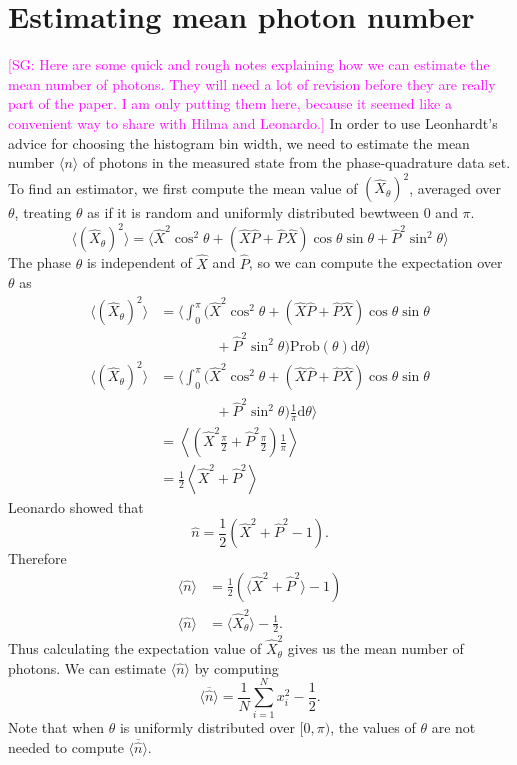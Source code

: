 \documentclass[
reprint,
superscriptaddress,
showpacs,
amsmath,
amssymb,
aps,
pra,
longbibliography
]{revtex4-1}
\providecommand{\aucmnt}[1]{#1}
\providecommand{\aucmnt}[1]{}
\newcommand{\SGc}[1]{\aucmnt{\textcolor{magenta}{[SG: #1]}}}
\begin{document}
\section{Estimating mean photon number}
\SGc{Here are some quick and rough notes explaining how we can
  estimate the mean number of photons.  They will need a lot of
  revision before they are really part of the paper.  I am only
  putting them here, because it seemed like a convenient way to share
  with Hilma and Leonardo.}  In order to use Leonhardt's advice for
choosing the histogram bin width, we need to estimate the mean number
$\langle n \rangle$ of photons in the measured state from the
phase-quadrature data set.  To find an estimator, we first compute the
mean value of $(\hat{X}_{\theta})^{2}$, averaged over $\theta$, treating
$\theta$ as if it is random and uniformly distributed bewtween $0$ and
$\pi$.
\begin{equation}
\langle (\hat{X}_{\theta})^{2} \rangle = \langle \hat{X}^{2}\cos^{2}\theta + (\hat{X}\hat{P}+\hat{P}\hat{X})\cos\theta\sin\theta + \hat{P}^{2}\sin^{2}\theta \rangle
\end{equation}
The phase $\theta$ is independent of $\hat{X}$ and $\hat{P}$, so we can compute the expectation over $\theta$ as
\begin{align}
\langle (\hat{X}_{\theta})^{2} \rangle &= \Big\langle \int_{0}^{\pi} (\hat{X}^{2}\cos^{2}\theta + (\hat{X}\hat{P}+\hat{P}\hat{X})\cos\theta\sin\theta \nonumber \\
 & \qquad \qquad + \hat{P}^{2}\sin^{2}\theta) \mathrm{Prob}(\theta) \mathrm{d}\theta \Big\rangle \\
\langle (\hat{X}_{\theta})^{2} \rangle &= \Big\langle \int_{0}^{\pi} (\hat{X}^{2}\cos^{2}\theta + (\hat{X}\hat{P}+\hat{P}\hat{X})\cos\theta\sin\theta \nonumber \\
 & \qquad \qquad + \hat{P}^{2}\sin^{2}\theta) \frac{1}{\pi} \mathrm{d}\theta \Big\rangle \\
 &= \left\langle (\hat{X}^{2}\frac{\pi}{2} + \hat{P}^{2}\frac{\pi}{2})\frac{1}{\pi} \right\rangle \\
 &= \frac{1}{2}\left\langle \hat{X}^{2} + \hat{P}^{2} \right\rangle
\end{align}
Leonardo showed that
\begin{equation}
\hat{n} = \frac{1}{2}\left(\hat{X}^{2}+\hat{P}^{2}-1\right).
\end{equation}
Therefore
\begin{align}
\langle\hat{n}\rangle &= \frac{1}{2}\left(\langle\hat{X}^{2}+\hat{P}^{2}\rangle-1\right) \\
\langle\hat{n}\rangle &= \langle \hat{X}_{\theta}^{2}\rangle-\frac{1}{2}.
\end{align}
Thus calculating the expectation value of $\hat{X}_{\theta}^{2}$ gives us the mean number of photons.  We can estimate $\langle \hat{n} \rangle$ by computing
\begin{equation}
\overline{\langle \hat{n} \rangle} = \frac{1}{N} \sum_{i=1}^{N}x_{i}^{2} - \frac{1}{2}.
\end{equation}
Note that when $\theta$ is uniformly distributed over $[0,\pi)$, the values of $\theta$ are not needed to compute $\overline{\langle \hat{n} \rangle}$.
\end{document}
